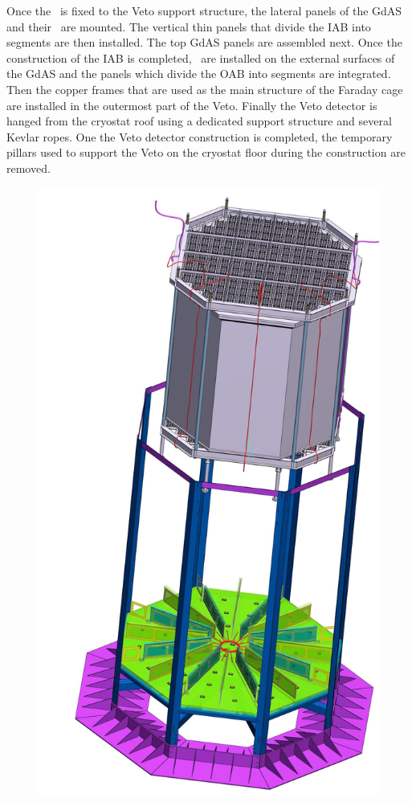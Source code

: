 Once the \TPC\ is fixed to the Veto support structure, the lateral panels of the GdAS and their \DSkPdms\ are mounted.  The vertical thin panels that divide the IAB into segments are then installed. The top GdAS panels are assembled next. Once the construction of the IAB is completed, \DSkPdms\ are installed on the external surfaces of the GdAS and the panels which divide the OAB into segments are integrated. Then the copper frames that are used as the main structure of the Faraday cage are installed in the outermost part of the Veto. Finally the Veto detector is hanged from the cryostat roof using a dedicated support structure and several Kevlar ropes. One the Veto detector construction is completed, the temporary pillars used to support the Veto on the cryostat floor during the construction are removed. 

\begin{figure}[!t]
\includegraphics[height=0.4\textheight]{./Figures/Veto-Assembly_new.jpg}

\end{figure}
